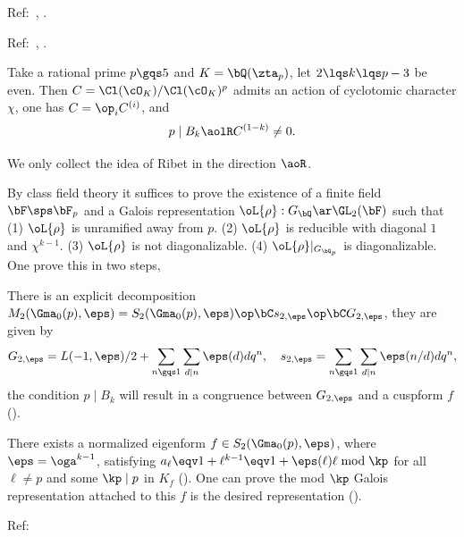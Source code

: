 \documentclass[a4paper, twoside]{article}
\begin{document}
\confighead{}{}{}



\begin{cmt}[0]

Ref:~\cite{Ribet1976Modular,Wiles1980,MW1984}, \cite{Wiles1990Iwasawa}.

Ref:~\cite{Washington1997}, \cite{Rubin1991}.


\begin{thm}
	Take a rational prime $p\gqs5$ and $K=\bQ(\zta_{p})$, let $2\lqs k\lqs p-3$ be even.
	Then $C=\Cl(\cO_{K})/\Cl(\cO_{K})^{p}$ admits an action of cyclotomic character $\chi$, one has $C=\op_{i}C^{(i)}$, and
	\[
		p\mid B_{k}\aolR C^{(1-k)}\neq0.
	\]
\end{thm}

\begin{prf}
	We only collect the idea of Ribet in the direction $\aoR$.

	By class field theory it suffices to prove the existence of a finite field $\bF\sps\bF_{p}$ and a Galois representation $\oL{\rho}:G_{\bQ}\ar\GL_{2}(\bF)$ such that (1) $\oL{\rho}$ is unramified away from $p$. (2) $\oL{\rho}$ is reducible with diagonal $1$ and $\chi^{k-1}$. (3) $\oL{\rho}$ is not diagonalizable. (4) $\oL{\rho}|_{G_{\bQ_{p}}}$ is diagonalizable. One prove this in two steps,

	 There is an explicit decomposition $M_{2}(\Gma_{0}(p),\eps)=S_{2}(\Gma_{0}(p),\eps)\op\bC s_{2,\eps}\op\bC G_{2,\eps}$, they are given by
	\[
		G_{2,\eps}=L(-1,\eps)/2+\sum_{n\gqs1}\sum_{d\mid n}\eps(d)dq^{n},\quad s_{2,\eps}=\sum_{n\gqs1}\sum_{d\mid n}\eps(n/d)dq^{n},
	\]
	the condition $p\mid B_{k}$ will result in a congruence between $G_{2,\eps}$ and a cuspform $f$ (\cite[3.4, 3.5]{Ribet1976Modular}).

	There exists a normalized eigenform $f\in S_{2}(\Gma_{0}(p),\eps)$, where $\eps=\oga^{k-1}$, satisfying $a_{\ell}\eqv1+\ell^{k-1}\eqv1+\eps(\ell)\ell\bmod{\kp}$ for all $\ell\neq p$ and some $\kp\mid p$ in $K_{f}$ (\cite[3.7]{Ribet1976Modular}). One can prove the mod $\kp$ Galois representation attached to this $f$ is the desired representation (\cite[4.2, 4.3, 4.4]{Ribet1976Modular}).
\end{prf}


\end{cmt}

Ref:~\cite{MW1984}
\end{document}
